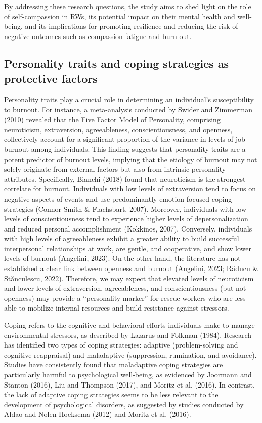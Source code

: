 \documentclass[
  man]{apa6}
\begin{document}
By addressing these research questions, the study aims to shed light on the role of self-compassion in RWs, its potential impact on their mental health and well-being, and its implications for promoting resilience and reducing the risk of negative outcomes such as compassion fatigue and burn-out.

\hypertarget{personality-traits-and-coping-strategies-as-protective-factors}{%
\subsection{Personality traits and coping strategies as protective factors}\label{personality-traits-and-coping-strategies-as-protective-factors}}

Personality traits play a crucial role in determining an individual's susceptibility to burnout. For instance, a meta-analysis conducted by Swider and Zimmerman (2010) revealed that the Five Factor Model of Personality, comprising neuroticism, extraversion, agreeableness, conscientiousness, and openness, collectively account for a significant proportion of the variance in levels of job burnout among individuals. This finding suggests that personality traits are a potent predictor of burnout levels, implying that the etiology of burnout may not solely originate from external factors but also from intrinsic personality attributes. Specifically, Bianchi (2018) found that neuroticism is the strongest correlate for burnout. Individuals with low levels of extraversion tend to focus on negative aspects of events and use predominantly emotion-focused coping strategies (Connor-Smith \& Flachsbart, 2007). Moreover, individuals with low levels of conscientiousness tend to experience higher levels of depersonalization and reduced personal accomplishment (Kokkinos, 2007). Conversely, individuals with high levels of agreeableness exhibit a greater ability to build successful interpersonal relationships at work, are gentle, and cooperative, and show lower levels of burnout (Angelini, 2023). On the other hand, the literature has not established a clear link between openness and burnout (Angelini, 2023; Răducu \& Stănculescu, 2022). Therefore, we may expect that elevated levels of neuroticism and lower levels of extraversion, agreeableness, and conscientiousness (but not openness) may provide a ``personality marker'' for rescue workers who are less able to mobilize internal resources and build resistance against stressors.

Coping refers to the cognitive and behavioral efforts individuals make to manage environmental stressors, as described by Lazarus and Folkman (1984). Research has identified two types of coping strategies: adaptive (problem-solving and cognitive reappraisal) and maladaptive (suppression, rumination, and avoidance). Studies have consistently found that maladaptive coping strategies are particularly harmful to psychological well-being, as evidenced by Joormann and Stanton (2016), Liu and Thompson (2017), and Moritz et al. (2016). In contrast, the lack of adaptive coping strategies seems to be less relevant to the development of psychological disorders, as suggested by studies conducted by Aldao and Nolen-Hoeksema (2012) and Moritz et al. (2016).
\end{document}
